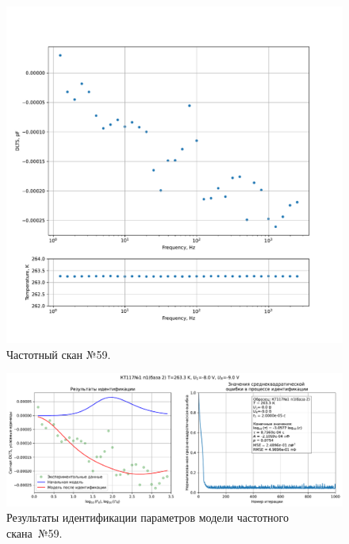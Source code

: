\begin{figure}[!ht]
    \centering
    \includegraphics[width=1\textwidth]{../plots/КТ117№1_п1(база 2)_2500Гц-1Гц_1пФ_-10С_-8В-9В_20мВ_20мкс_шаг_0,1.pdf}
    \caption{Частотный скан №59.}
    \label{pic:frequency_scan_59}
\end{figure}

\begin{figure}[!ht]
    \centering
    \includegraphics[width=1\textwidth]{../plots/КТ117№1_п1(база 2)_2500Гц-1Гц_1пФ_-10С_-8В-9В_20мВ_20мкс_шаг_0,1_model.pdf}
    \caption{Результаты идентификации параметров модели частотного скана~№59.}
    \label{pic:frequency_scan_model59}
\end{figure}

\pagebreak


